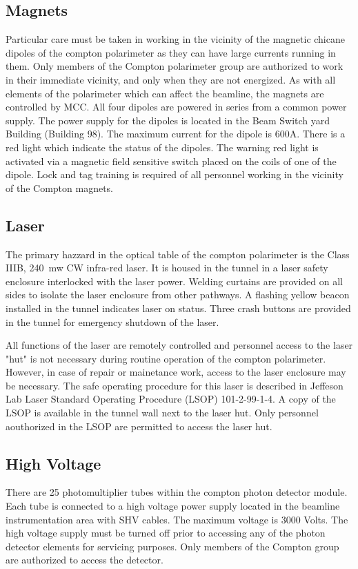\begin{safetyen}{10}{15}
\subsection{Magnets}

Particular care must be taken in working in the vicinity of the
magnetic chicane dipoles of the compton polarimeter as they can have large currents
running in them. Only members of the Compton polarimeter group are
authorized to work in their immediate vicinity, and only when they are
not energized. As with all elements of the
polarimeter which can
affect the beamline, the magnets are controlled by MCC. All four dipoles are
powered in series from a common power supply. The power supply for
the dipoles is located in the Beam Switch yard Building (Building 98).
The maximum current for the dipole is 600A. There is a
red light which indicate the status of the dipoles. The warning red
light is activated via a magnetic field sensitive switch placed
on the coils of one of the dipole. Lock and tag training is required of all personnel working
in the vicinity of the Compton magnets. \\

\subsection{Laser}
The primary hazzard in the optical table of the compton polarimeter is the Class IIIB, 240~mw 
CW infra-red laser.
It is housed in the tunnel in a laser safety enclosure interlocked with the laser power.
Welding curtains are provided on all sides to isolate the laser enclosure from other pathways.
A flashing yellow beacon installed in the tunnel indicates laser on status. Three crash  buttons
are provided in the tunnel for emergency shutdown of the laser.

All functions of the laser are remotely controlled and personnel access to the laser "hut" 
is not necessary during routine operation of the compton polarimeter. However, in case of repair  
or mainetance work, access to the laser enclosure may be necessary. The safe operating procedure for this laser is described in 
Jeffeson Lab Laser Standard Operating Procedure (LSOP) 101-2-99-1-4. A copy of the LSOP is 
available in the tunnel wall next to the laser hut. Only personnel aouthorized in the LSOP are
permitted to access the laser hut.
 

\subsection{High Voltage}

There are 25 photomultiplier tubes within the compton photon detector module.
Each tube is connected to a high voltage power supply located in the beamline instrumentation area
with SHV cables. The maximum voltage is 3000 Volts.
The high voltage supply must be turned off prior to accessing  any of the photon detector elements
for servicing purposes. Only members of the Compton group
are authorized to access the  detector.\\

\end{safetyen}

